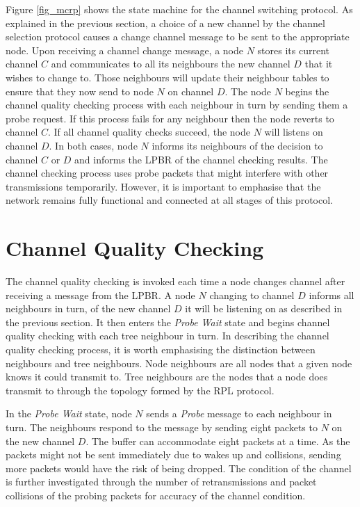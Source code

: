 Figure \ref{fig_mcrp} shows the state machine for the channel switching protocol.
As explained in the previous section, a choice of a new channel by the channel selection protocol causes a change channel message to be sent to the appropriate node. 
Upon receiving a channel change message, a node $N$ stores its current channel $C$ and communicates to all its neighbours the new channel $D$ that it wishes to change to. Those neighbours will update their neighbour tables to ensure that they now send to node $N$ on channel $D$.  The node $N$ begins the channel quality checking process with each neighbour in turn by sending them a probe request. If this process fails for any neighbour then the node reverts to channel $C$. If all channel quality checks succeed, the node $N$ will listens on channel $D$. In both cases, node $N$ informs its neighbours of the decision to channel $C$ or $D$ and informs the LPBR of the channel checking results. The channel checking process uses probe packets that might interfere with other transmissions temporarily. However, it is important to emphasise that the network remains fully functional and connected at all stages of this protocol.

\section{Channel Quality Checking}
The channel quality checking is invoked each time a node changes channel after receiving a message from the LPBR. A node $N$ changing to channel $D$ informs all neighbours in turn, of the new channel $D$ it will be listening on as described in the previous section. It then enters the \emph{Probe Wait} state and begins channel quality checking with each tree neighbour in turn. In describing the channel quality checking process, it is worth emphasising the distinction between neighbours and tree neighbours. Node neighbours are all nodes that a given node knows it could transmit to. Tree neighbours are the nodes that a node does transmit to through the topology formed by the RPL protocol. 

In the \emph{Probe Wait} state, node $N$ sends a \emph{Probe} message to each neighbour in turn. The neighbours respond to the message by sending eight packets to $N$ on the new channel $D$. 
The buffer can accommodate eight packets at a time. As the packets might not be sent immediately due to wakes up and collisions, sending more packets would have the risk of being dropped. 
The condition of the channel is further investigated through the number of retransmissions and packet collisions of the probing packets for accuracy of the channel condition. 

